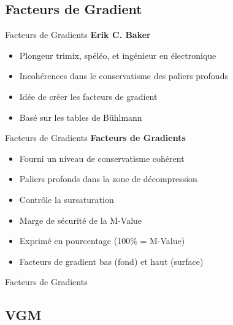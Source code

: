 \subsection{Facteurs de Gradient}

\begin{frame}{Facteurs de Gradients}  
	\textbf{Erik  C. Baker}
	\begin{itemize}
		\item Plongeur trimix, spéléo, et ingénieur en électronique
		\item Incohérences dans le conservatisme des paliers profonds
		\item Idée de créer les facteurs de gradient
		\item Basé sur les tables de Bühlmann
	\end{itemize}
\end{frame}

\begin{frame}{Facteurs de Gradients}  
	\textbf{Facteurs de Gradients}
	\begin{itemize}
		\item Fourni un niveau de conservatisme cohérent
		\item Paliers profonds dans la zone de décompression
		\item Contrôle la sursaturation
		\item Marge de sécurité de la M-Value
		\item Exprimé en pourcentage (100\% = M-Value)
		\item Facteurs de gradient bas (fond) et haut (surface)
	\end{itemize}
\end{frame}

\begin{frame}{Facteurs de Gradients}  
\end{frame}

\subsection{VGM}



